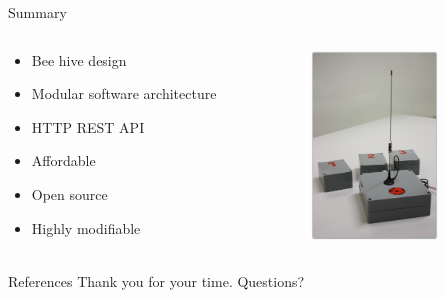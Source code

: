 \documentclass{beamer}
\begin{document}
\begin{frame}{Summary}
\begin{columns}[T]
	\begin{column}[T]{6cm}
		\begin{itemize}
		\item Bee hive design
		\item Modular software architecture
		\item HTTP REST API
		\item Affordable
		\item Open source
		\item Highly modifiable
		\end{itemize}
	\end{column}
	\begin{column}[T]{4cm}
	\includegraphics[height=5cm]{graphics/Field_pictures/Main_and_Wixels.JPG}
	\end{column}
\end{columns}
\end{frame}

\begin{frame}{References}
Thank you for your time.
Questions?

{\tiny }
\end{frame}
\end{document}
